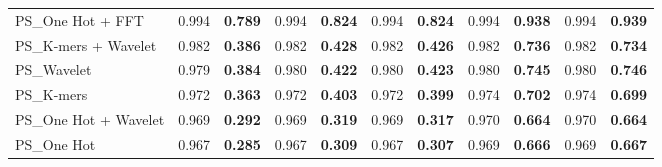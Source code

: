 \begin{table*}[htbp]
\begin{tabular}{lcccccccccc}
PS\_One Hot + FFT & 0.994 & \textbf{0.789} & 0.994 & \textbf{0.824} & 0.994 & \textbf{0.824} & 0.994 & \textbf{0.938} & 0.994 & \textbf{0.939} \\
PS\_K-mers + Wavelet & 0.982 & \textbf{0.386} & 0.982 & \textbf{0.428} & 0.982 & \textbf{0.426} & 0.982 & \textbf{0.736} & 0.982 & \textbf{0.734} \\
PS\_Wavelet & 0.979 & \textbf{0.384} & 0.980 & \textbf{0.422} & 0.980 & \textbf{0.423} & 0.980 & \textbf{0.745} & 0.980 & \textbf{0.746} \\
PS\_K-mers & 0.972 & \textbf{0.363} & 0.972 & \textbf{0.403} & 0.972 & \textbf{0.399} & 0.974 & \textbf{0.702} & 0.974 & \textbf{0.699} \\
PS\_One Hot + Wavelet & 0.969 & \textbf{0.292} & 0.969 & \textbf{0.319} & 0.969 & \textbf{0.317} & 0.970 & \textbf{0.664} & 0.970 & \textbf{0.664} \\
PS\_One Hot & 0.967 & \textbf{0.285} & 0.967 & \textbf{0.309} & 0.967 & \textbf{0.307} & 0.969 & \textbf{0.666} & 0.969 & \textbf{0.667} \\
\bottomrule
\end{tabular}
\end{table*}


